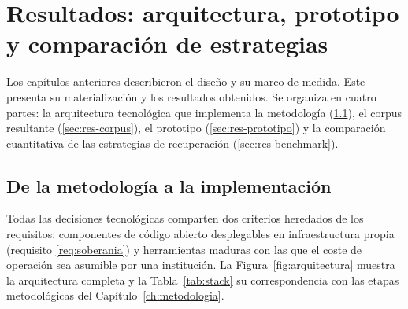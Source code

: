 \chapter[Resultados]{Resultados: arquitectura, prototipo y comparación de estrategias}
\label{ch:resultados}

Los capítulos anteriores describieron el diseño y su marco de medida.
Este presenta su materialización y los resultados obtenidos.
Se organiza en cuatro partes: la arquitectura tecnológica que implementa la metodología (\ref{sec:res-arquitectura}), el corpus resultante (\ref{sec:res-corpus}), el prototipo \proyecto (\ref{sec:res-prototipo}) y la comparación cuantitativa de las estrategias de recuperación (\ref{sec:res-benchmark}).

\section{De la metodología a la implementación}
\label{sec:res-arquitectura}

Todas las decisiones tecnológicas comparten dos criterios heredados de los requisitos: componentes de código abierto desplegables en infraestructura propia (requisito \ref{req:soberania}) y herramientas maduras con las que el coste de operación sea asumible por una institución.
La Figura~\ref{fig:arquitectura} muestra la arquitectura completa y la Tabla~\ref{tab:stack} su correspondencia con las etapas metodológicas del Capítulo~\ref{ch:metodologia}.

